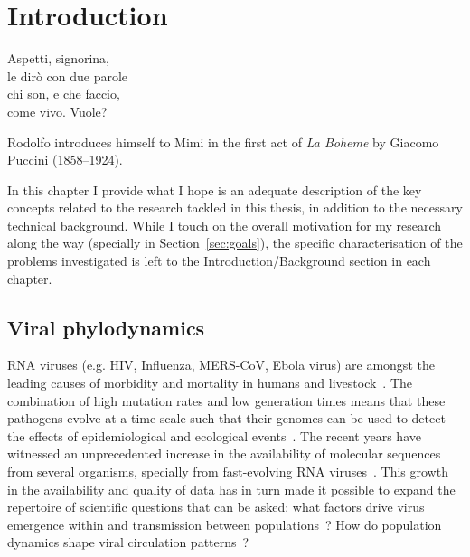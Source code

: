 \chapter{Introduction}
\epigraph{ 
Aspetti, signorina,\\
le dir\`{o} con due parole\\
chi son, e che faccio, \\
come vivo.  Vuole?%
}{Rodolfo introduces himself to Mimi in the first act of \textit{La Boheme} by Giacomo Puccini (1858--1924).}

In this chapter I provide what I hope is an adequate description of the key concepts related to the research tackled in this thesis, in addition to the necessary technical background.
While I touch on the overall motivation for my research along the way (specially in Section~\ref{sec:goals}), the specific characterisation of the problems investigated is left to the Introduction/Background section in each chapter. 

\section{Viral phylodynamics}

RNA viruses (e.g. HIV, Influenza, MERS-CoV, Ebola virus) are amongst the leading causes of morbidity and mortality in humans and livestock~\citep{Woolhouse2002}.
The combination of high mutation rates and low generation times means that these pathogens evolve at a time scale such that their genomes can be used to detect the effects of epidemiological and ecological events~\citep{Drummond2003,Grenfell2004,Duffy2008,Pybus2009}.
The recent years have witnessed an unprecedented increase in the availability of molecular sequences from several organisms, specially from fast-evolving RNA viruses~\citep{Benson2014}.
This growth in the availability and quality of data has in turn made it possible to expand the repertoire of scientific questions that can be asked: what factors drive virus emergence within and transmission between populations~\citep{Dudas2017,Dudas2018}? How do population dynamics shape viral circulation patterns~\citep{Volz2013,Bedford2015}?

